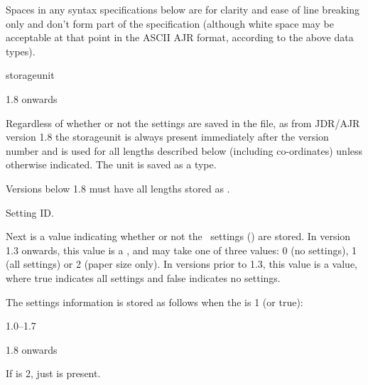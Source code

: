 \begin{important}
Spaces in any syntax specifications below are for clarity and ease
of line breaking only and don't form part of the specification
(although white space may be acceptable at that point in the ASCII
\gls{AJR} format, according to the above data types).
\end{important}

\begin{numbered}

\item \label{jdr:storageunit}\Gls{storageunit}
\begin{jdrversion}{1.8 onwards}
\begin{syntaxline}
\end{syntaxline}
\end{jdrversion}
Regardless of whether or not the settings are saved in the file, as
from JDR/AJR version 1.8 the \gls{storageunit}  is
always present immediately after the version number and is used for
all lengths described below (including \glspl{co-ordinate}) unless
otherwise indicated. The unit is saved as a  type.

Versions below 1.8 must have all lengths stored as
.

\item\label{jdr:settings-id}Setting ID.
\begin{syntaxline}
\end{syntaxline}
Next is a value  indicating whether or not the
\FlowframTk\ settings () are
stored.
In version 1.3 onwards, this value is a , and may take one of three
values: 0 (no settings), 1 (all settings) or 2 (paper size only).
In versions prior to 1.3, this value is a  value,
where true indicates all settings and false indicates no settings.

\item\label{jdr:settings}
The settings information is stored as follows when the
 is 1 (or true):
\begin{jdrversion}{1.0--1.7}
\begin{syntaxline}
   
  
\end{syntaxline}
\end{jdrversion}
\begin{jdrversion}{1.8 onwards}
\begin{syntaxline}
   
   
\end{syntaxline}
\end{jdrversion}
If  is 2, just  is present.


\end{numbered}
